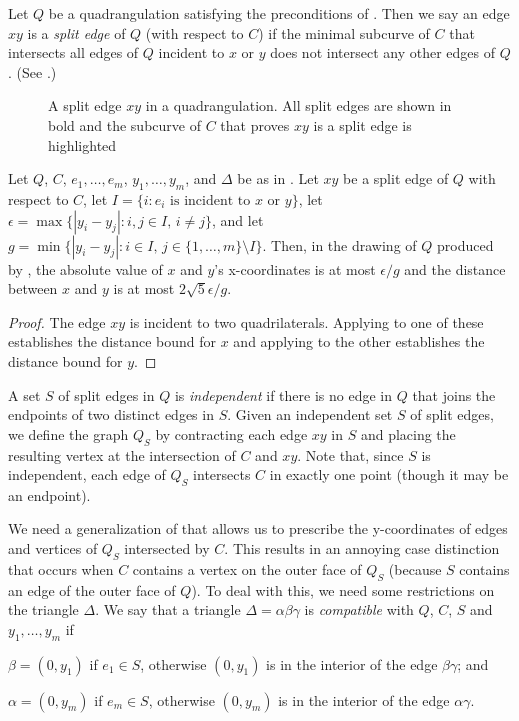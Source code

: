 \documentclass{patmorin}
\begin{document}
Let $Q$ be a quadrangulation satisfying the preconditions of
. Then we say an edge $xy$ is a \emph{split edge} of $Q$
(with respect to $C$) if the minimal subcurve of $C$ that intersects all
edges of $Q$ incident to $x$ or $y$ does not intersect any other edges
of $Q$. (See .)

\begin{figure}
   \caption{A split edge $xy$ in a quadrangulation.  All split edges are shown in bold and the subcurve of $C$ that proves $xy$ is a split edge is highlighted}
\end{figure}

\begin{cor}
  Let $Q$, $C$, $e_1,\ldots,e_m$, $y_1,\ldots,y_m$, and $\Delta$
  be as in .  Let $xy$ be a split edge of $Q$ with
  respect to $C$, let $I=\{i:\text{$e_i$ is incident to $x$ or
  $y$}\}$, let $\epsilon=\max\{|y_i-y_j|:i,j\in I,\, i\neq j\}$, and
  let $g=\min\{|y_i-y_j|: i\in I,\, j\in\{1,\ldots,m\}\setminus I\}$.
  Then, in the drawing of $Q$ produced by , the absolute
  value of $x$ and $y$'s x-coordinates is at most $\epsilon/g$ and the
  distance between $x$ and $y$ is at most $2\sqrt{5}\epsilon/g$.
\end{cor}

\begin{proof}
   The edge $xy$ is incident to two quadrilaterals. Applying
    to one of these establishes the distance bound
   for $x$ and applying  to the other establishes
   the distance bound for $y$.
\end{proof}

A set $S$ of split edges in $Q$ is \emph{independent} if there is no
edge in $Q$ that joins the endpoints of two distinct edges in $S$.
Given an independent set $S$ of split edges, we define the graph $Q_S$
by contracting each edge $xy$ in $S$ and placing the resulting vertex at
the intersection of $C$ and $xy$.  Note that, since $S$ is independent,
each edge of $Q_S$ intersects $C$ in exactly one point (though it may
be an endpoint).

We need a generalization of  that allows us to prescribe
the y-coordinates of edges and vertices of $Q_S$ intersected by $C$.
This results in an annoying case distinction that occurs when $C$ contains
a vertex on the outer face of $Q_S$ (because $S$ contains an edge of the
outer face of $Q$).  To deal with this, we need some restrictions on the
triangle $\Delta$.  We say that a triangle $\Delta=\alpha\beta\gamma$
is \emph{compatible} with $Q$, $C$, $S$ and $y_1,\ldots,y_m$ if
\begin{compactenum}
  \item $\beta=(0,y_1)$ if $e_1\in S$, otherwise $(0,y_1)$ is in the interior
  of the edge $\beta\gamma$; and
  \item $\alpha=(0,y_m)$ if $e_m\in S$, otherwise $(0,y_m)$ is in the interior
  of the edge $\alpha\gamma$.
\end{compactenum}
\end{document}
